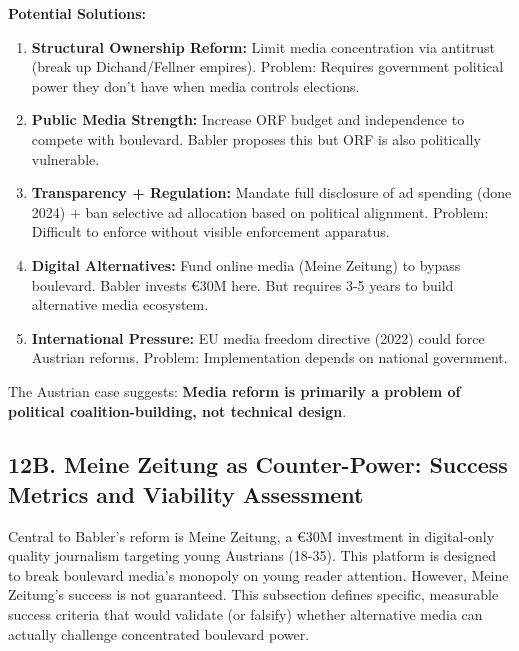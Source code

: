 \textbf{Potential Solutions:}

\begin{enumerate}
\item \textbf{Structural Ownership Reform:} Limit media concentration via antitrust
  (break up Dichand/Fellner empires). Problem: Requires government political power
  they don't have when media controls elections.

\item \textbf{Public Media Strength:} Increase ORF budget and independence to compete
  with boulevard. Babler proposes this but ORF is also politically vulnerable.

\item \textbf{Transparency + Regulation:} Mandate full disclosure of ad spending
  (done 2024) + ban selective ad allocation based on political alignment.
  Problem: Difficult to enforce without visible enforcement apparatus.

\item \textbf{Digital Alternatives:} Fund online media (Meine Zeitung) to bypass
  boulevard. Babler invests €30M here. But requires 3-5 years to build alternative
  media ecosystem.

\item \textbf{International Pressure:} EU media freedom directive (2022) could
  force Austrian reforms. Problem: Implementation depends on national government.
\end{enumerate}

The Austrian case suggests: \textbf{Media reform is primarily a problem of political
coalition-building, not technical design}.

\label{sec:dx-meine-zeitung-metrics}

\subsection*{12B. Meine Zeitung as Counter-Power: Success Metrics and Viability Assessment}

Central to Babler's reform is Meine Zeitung, a €30M investment in digital-only quality journalism
targeting young Austrians (18-35). This platform is designed to break boulevard media's monopoly on
young reader attention. However, Meine Zeitung's success is not guaranteed. This subsection defines
specific, measurable success criteria that would validate (or falsify) whether alternative media can
actually challenge concentrated boulevard power.

